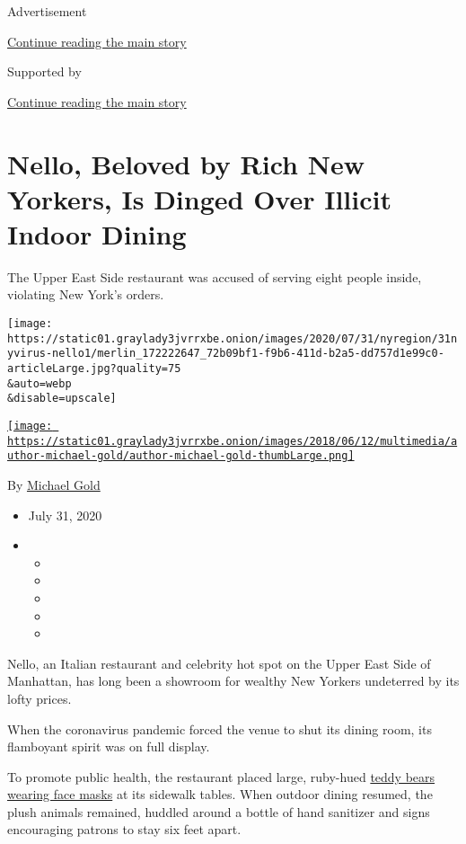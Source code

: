 Advertisement

\protect\hyperlink{after-top}{Continue reading the main story}

Supported by

\protect\hyperlink{after-sponsor}{Continue reading the main story}

\hypertarget{nello-beloved-by-rich-new-yorkers-is-dinged-over-illicit-indoor-dining}{%
\section{Nello, Beloved by Rich New Yorkers, Is Dinged Over Illicit
Indoor
Dining}\label{nello-beloved-by-rich-new-yorkers-is-dinged-over-illicit-indoor-dining}}

The Upper East Side restaurant was accused of serving eight people
inside, violating New York's orders.

\texttt{[image: https://static01.graylady3jvrrxbe.onion/images/2020/07/31/nyregion/31nyvirus-nello1/merlin\_172222647\_72b09bf1-f9b6-411d-b2a5-dd757d1e99c0-articleLarge.jpg?quality=75\\\&auto=webp\\\&disable=upscale]}

\href{https://www.nytimes3xbfgragh.onion/by/michael-gold}{\texttt{[image: https://static01.graylady3jvrrxbe.onion/images/2018/06/12/multimedia/author-michael-gold/author-michael-gold-thumbLarge.png]}}

By \href{https://www.nytimes3xbfgragh.onion/by/michael-gold}{Michael
Gold}

\begin{itemize}
\item
  July 31, 2020
\item
  \begin{itemize}
  \item
  \item
  \item
  \item
  \item
  \end{itemize}
\end{itemize}

Nello, an Italian restaurant and celebrity hot spot on the Upper East
Side of Manhattan, has long been a showroom for wealthy New Yorkers
undeterred by its lofty prices.

When the coronavirus pandemic forced the venue to shut its dining room,
its flamboyant spirit was on full display.

To promote public health, the restaurant placed large, ruby-hued
\href{https://www.instagram.com/p/CAWO_ptHZkY/?igshid=1hs6i7mj6zg5i}{teddy
bears wearing face masks} at its sidewalk tables. When outdoor dining
resumed, the plush animals remained, huddled around a bottle of hand
sanitizer and signs encouraging patrons to stay six feet apart.

